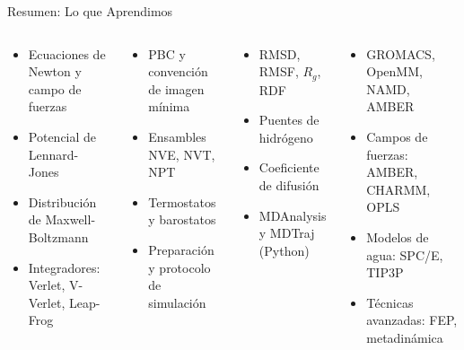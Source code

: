\documentclass[aspectratio=169, 10pt]{beamer}
\begin{document}
\begin{frame}[shrink=3]{Resumen: Lo que Aprendimos}

\begin{columns}[T]
\begin{tcolorbox}[definitionbox, title={\faAtom\ Fundamentos}, equal height group=ehg-res-a]
\small
\begin{itemize}
  \item[$\checkmark$] Ecuaciones de Newton y campo de fuerzas
  \item[$\checkmark$] Potencial de Lennard-Jones
  \item[$\checkmark$] Distribución de Maxwell-Boltzmann
  \item[$\checkmark$] Integradores: Verlet, V-Verlet, Leap-Frog
\end{itemize}
\end{tcolorbox}
\vspace{0.3em}
\begin{tcolorbox}[formulabox, title={\faFlask\ Práctica}, equal height group=ehg-res-b]
\small
\begin{itemize}
  \item[$\checkmark$] PBC y convención de imagen mínima
  \item[$\checkmark$] Ensambles NVE, NVT, NPT
  \item[$\checkmark$] Termostatos y barostatos
  \item[$\checkmark$] Preparación y protocolo de simulación
\end{itemize}
\end{tcolorbox}

\begin{tcolorbox}[warningbox, title={\faChartBar\ Análisis}, equal height group=ehg-res-a]
\small
\begin{itemize}
  \item[$\checkmark$] RMSD, RMSF, $R_g$, RDF
  \item[$\checkmark$] Puentes de hidrógeno
  \item[$\checkmark$] Coeficiente de difusión
  \item[$\checkmark$] MDAnalysis y MDTraj (Python)
\end{itemize}
\end{tcolorbox}
\vspace{0.3em}
\begin{tcolorbox}[definitionbox, title={\faLaptopCode\ Herramientas}, equal height group=ehg-res-b]
\small
\begin{itemize}
  \item[$\checkmark$] GROMACS, OpenMM, NAMD, AMBER
  \item[$\checkmark$] Campos de fuerzas: AMBER, CHARMM, OPLS
  \item[$\checkmark$] Modelos de agua: SPC/E, TIP3P
  \item[$\checkmark$] Técnicas avanzadas: FEP, metadinámica
\end{itemize}
\end{tcolorbox}
\end{columns}
\end{frame}
\end{document}
